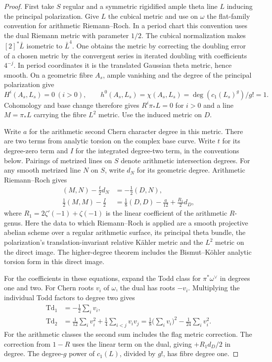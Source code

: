 \begin{proof}

First take \(S\) regular and a symmetric rigidified ample theta
line \(L\) inducing the principal polarization. Give \(L\) the
cubical metric and use on \(\omega\) the flat-family convention
for arithmetic Riemann--Roch. In a period chart this convention
uses the dual Riemann metric with parameter \(1/2\).
The cubical normalization makes \([2]^*\bar L\) isometric to
\(\bar L^4\). One obtains the metric by correcting the doubling
error of a chosen metric by the convergent series in iterated
doubling with coefficients \(4^{-j}\). In period coordinates it
is the translated Gaussian theta metric, hence smooth. On a geometric fibre \(A_s\), ample vanishing and the degree of
the principal polarization give
\[
 H^i(A_s,L_s)=0\ (i>0),\qquad
 h^0(A_s,L_s)=\chi(A_s,L_s)=\deg(c_1(L_s)^g)/g!=1 .
\]
Cohomology and base change therefore gives \(R^i\pi_*L=0\) for \(i>0\)
and a line \(M=\pi_*L\) carrying the fibre \(L^2\) metric. Use the
induced metric on \(D\).

Write \(a\) for the arithmetic second Chern character degree in
this metric. There are two terms from analytic torsion on the
complex base curve. Write \(t\) for its degree-zero term and
\(I\) for the integrated degree-two term, in the conventions
below. Pairings of metrized lines on \(S\) denote arithmetic
intersection degrees. For any smooth metrized line \(N\) on
\(S\), write \(d_N\) for its geometric degree. Arithmetic
Riemann--Roch gives
\begin{align}
 (M,N) - \tfrac t2 d_N &= -\tfrac12(D,N),\label{eq:hodge-arr-linear}\\
 \tfrac12(M,M)-\tfrac I2
     &=\tfrac18(D,D)-\tfrac{a}{12}+\tfrac{R_1}{2}d_D ,
     \label{eq:hodge-arr-square}
\end{align}
where \(R_1=2\zeta'(-1)+\zeta(-1)\) is the linear coefficient
of the arithmetic \(R\)-genus. Here the data to which Riemann--Roch is applied
are a smooth projective abelian scheme over a regular arithmetic
surface, its principal theta bundle, the polarization's
translation-invariant relative Kähler metric and the \(L^2\)
metric on the direct image. The higher-degree theorem includes
the Bismut--Köhler analytic torsion form in this direct image.
\cite{arithmetic-rr-surface}\label{cor:hodge-surface-degree-2}

For the coefficients in these equations, expand the Todd
class for \(\pi^*\omega^\vee\) in degrees one and two. For Chern roots \(v_i\) of \(\omega\), the dual has roots \(-v_i\).
Multiplying the individual Todd factors to degree two gives
\[
 \begin{aligned}
 \operatorname{Td}_1&=-\tfrac12\sum_i v_i,\\
 \operatorname{Td}_2&=\tfrac1{12}\sum_i v_i^2+\tfrac14\sum_{i<j}v_iv_j
 =\tfrac18\Big(\sum_i v_i\Big)^2-\tfrac1{24}\sum_i v_i^2 .
 \end{aligned}
\]
For the arithmetic classes the second sum includes the flag
metric correction. The correction from \(1-R\) uses the
linear term on the dual, giving \(+R_1d_D/2\) in degree.
The degree-\(g\) power of \(c_1(L)\), divided by \(g!\),
has fibre degree one.


\end{proof}
